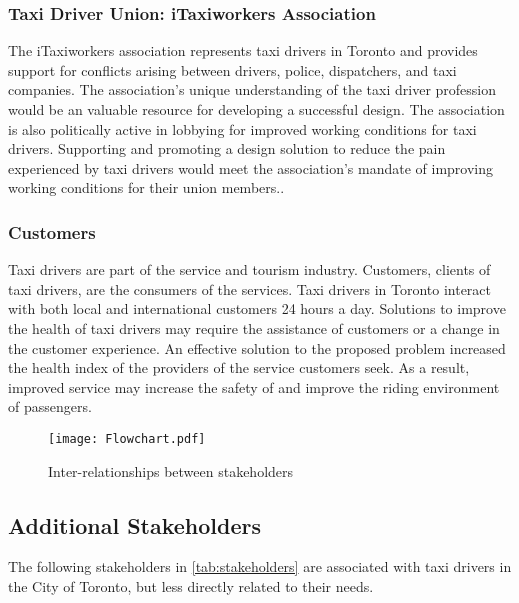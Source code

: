 \documentclass[11pt]{article}
\begin{document}
\subsubsection{Taxi Driver Union: iTaxiworkers Association}
The iTaxiworkers association represents taxi drivers in Toronto and 
provides support for conflicts arising between drivers, police, dispatchers, and 
taxi companies. The association’s unique understanding of the taxi driver 
profession would be an valuable resource for developing a successful design.
The association is also politically active in lobbying for improved working 
conditions for taxi drivers. Supporting and promoting a design solution to 
reduce the pain experienced by taxi drivers would meet the association’s mandate 
of improving working conditions for their union members.\cite{itaxi}. 

\subsubsection{Customers}
Taxi drivers are part of the service and tourism industry. Customers,
clients of taxi drivers, are the consumers of the services. Taxi 
drivers in Toronto interact with both local and international customers 
24 hours a day. Solutions to improve the health of taxi drivers 
may require the assistance of customers or a change in the customer 
experience. An effective solution to the proposed problem increased 
the health index of the providers of the service customers seek. As a 
result, improved service may increase the safety of and improve the 
riding environment of passengers.

 
\begin{figure}
  \centering
  \texttt{[image: Flowchart.pdf]}
  \caption{Inter-relationships between stakeholders}
\end{figure}
\subsection{Additional Stakeholders}

The following stakeholders in \ref{tab:stakeholders} are associated with taxi drivers in the City 
of Toronto, but less directly related to their needs. 
\end{document}
